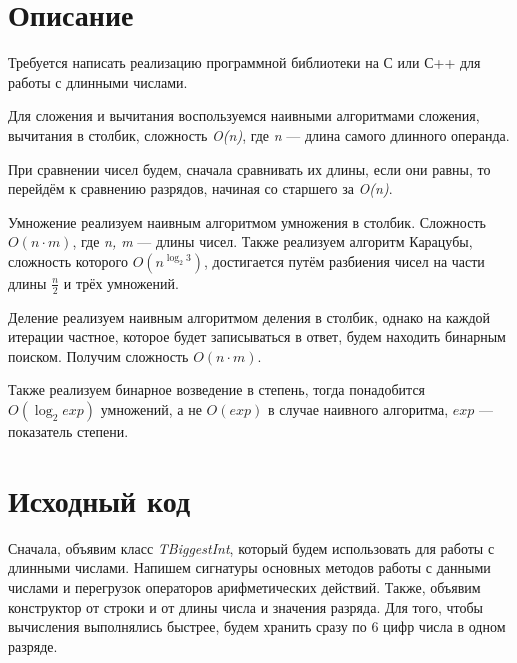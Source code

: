 \section{Описание}
Требуется написать реализацию программной библиотеки на С или С++ для работы с длинными числами. 

Для сложения и вычитания воспользуемся наивными алгоритмами сложения, вычитания в столбик, сложность \textit{O(n)}, где \textit{n} --- длина самого длинного операнда.

При сравнении чисел будем, сначала сравнивать их длины, если они равны, то перейдём к сравнению разрядов, начиная со старшего за \textit{O(n)}.

Умножение реализуем наивным алгоритмом умножения в столбик. Сложность \linebreak $O(n \cdot m)$, где \textit{n, m} --- длины чисел. 
Также реализуем алгоритм Карацубы, сложность которого $O(n^{\log_2 3})$, достигается путём разбиения чисел на части длины $\frac{n}{2}$ и трёх умножений.

Деление реализуем наивным алгоритмом деления в столбик, однако на каждой итерации частное, которое будет записываться в ответ, будем находить бинарным поиском. Получим сложность $O(n \cdot m)$.

Также реализуем бинарное возведение в степень, тогда понадобится $O(\log_2 exp)$ умножений, а не $O(exp)$ в случае наивного алгоритма, $exp$ --- показатель степени.
\pagebreak

\section{Исходный код}
Сначала, объявим класс \textit{TBiggestInt}, который будем использовать для работы с длинными числами. Напишем сигнатуры основных методов работы с данными числами и перегрузок операторов арифметических действий. Также, объявим конструктор от строки и от длины числа и значения разряда. Для того, чтобы вычисления выполнялись быстрее, будем хранить сразу по 6 цифр числа в одном разряде. 

